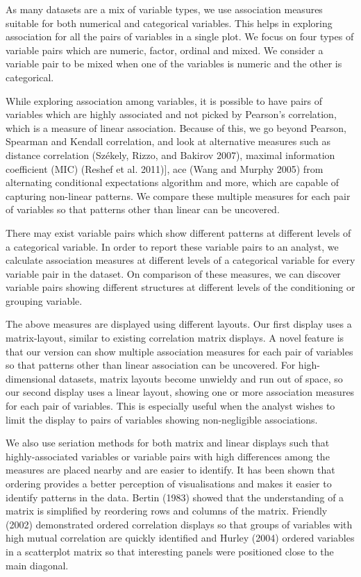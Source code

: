 As many datasets are a mix of variable types, we use association measures suitable for both numerical and categorical variables. This helps in exploring association for all the pairs of variables in a single plot. We focus on four types of variable pairs which are numeric, factor, ordinal and mixed. We consider a variable pair to be mixed when one of the variables is numeric and the other is categorical.

While exploring association among variables, it is possible to have pairs of variables which are highly associated and not picked by Pearson's correlation, which is a measure of linear association. Because of this, we go beyond Pearson, Spearman and Kendall correlation, and look at alternative measures such as distance correlation (Székely, Rizzo, and Bakirov 2007), maximal information coefficient (MIC) (Reshef et al. 2011){]}, ace (Wang and Murphy 2005) from alternating conditional expectations algorithm and more, which are capable of capturing non-linear patterns. We compare these multiple measures for each pair of variables so that patterns other than linear can be uncovered.

There may exist variable pairs which show different patterns at different levels of a categorical variable. In order to report these variable pairs to an analyst, we calculate association measures at different levels of a categorical variable for every variable pair in the dataset. On comparison of these measures, we can discover variable pairs showing different structures at different levels of the conditioning or grouping variable.

The above measures are displayed using different layouts. Our first display uses a matrix-layout, similar to existing correlation matrix displays. A novel feature is that our version can show multiple association measures for each pair of variables so that patterns other than linear association can be uncovered. For high-dimensional datasets, matrix layouts become unwieldy and run out of space, so our second display uses a linear layout, showing one or more association measures for each pair of variables. This is especially useful when the analyst wishes to limit the display to pairs of variables showing non-negligible associations.

We also use seriation methods for both matrix and linear displays such that highly-associated variables or variable pairs with high differences among the measures are placed nearby and are easier to identify. It has been shown that ordering provides a better perception of visualisations and makes it easier to identify patterns in the data. Bertin (1983) showed that the understanding of a matrix is simplified by reordering rows and columns of the matrix. Friendly (2002) demonstrated ordered correlation displays so that groups of variables with high mutual correlation are quickly identified and Hurley (2004) ordered variables in a scatterplot matrix so that interesting panels were positioned close to the main diagonal.

